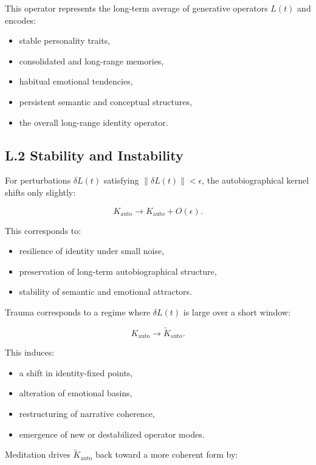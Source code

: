 \documentclass[12pt]{article}
\begin{document}
This operator represents the long-term average of generative operators $L(t)$
and encodes:

\begin{itemize}
    \item stable personality traits,
    \item consolidated and long-range memories,
    \item habitual emotional tendencies,
    \item persistent semantic and conceptual structures,
    \item the overall long-range identity operator.
\end{itemize}

\subsection*{L.2 Stability and Instability}

For perturbations $\delta L(t)$ satisfying $\|\delta L(t)\| < \epsilon$, the
autobiographical kernel shifts only slightly:

\[
K_{\text{auto}} \to K_{\text{auto}} + O(\epsilon).
\]

This corresponds to:

\begin{itemize}
    \item resilience of identity under small noise,
    \item preservation of long-term autobiographical structure,
    \item stability of semantic and emotional attractors.
\end{itemize}

Trauma corresponds to a regime where $\delta L(t)$ is large over a short window:

\[
K_{\text{auto}} \to \tilde{K}_{\text{auto}}.
\]

This induces:

\begin{itemize}
    \item a shift in identity-fixed points,
    \item alteration of emotional basins,
    \item restructuring of narrative coherence,
    \item emergence of new or destabilized operator modes.
\end{itemize}

Meditation drives $\tilde{K}_{\text{auto}}$ back toward a more coherent form by:
\end{document}
